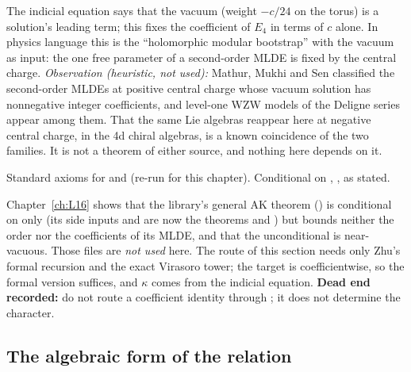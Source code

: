 \begin{physics}
The indicial equation says that the vacuum (weight $-c/24$ on the torus) is a solution's leading term; this fixes
the coefficient of $E_4$ in terms of $c$ alone. In physics language this is the ``holomorphic modular bootstrap''
with the vacuum as input: the one free parameter of a second-order MLDE is fixed by the central charge.
\emph{Observation (heuristic, not used):} Mathur, Mukhi and Sen classified the second-order MLDEs at positive central
charge whose vacuum solution has nonnegative integer coefficients, and level-one WZW models of the Deligne series
appear among them. That the same Lie algebras reappear here at negative central charge, in the 4d chiral algebras,
is a known coincidence of the two families. It is not a theorem of either source, and nothing here depends on it.
\end{physics}
\begin{status}
Standard axioms for  and  (re-run for this
chapter). Conditional on , ,
 as stated.
\end{status}

\begin{warning}[title={No modular forms, no Etingof-finiteness: what this replaces}]
Chapter~\ref{ch:L16} shows that the library's general AK theorem
() is conditional on
 only (its side inputs  and  are now the theorems
 and ) but bounds neither the order nor the coefficients of its
MLDE, and that the unconditional  is near-vacuous. Those files are
\emph{not used} here. The route of this section needs only Zhu's formal recursion and the exact Virasoro tower; the
target is coefficientwise, so the formal version suffices, and $\kappa$ comes from the indicial equation. \textbf{Dead end recorded:} do not route a coefficient identity through
; it does not determine the character.
\end{warning}

\subsection{The algebraic form of the relation}

